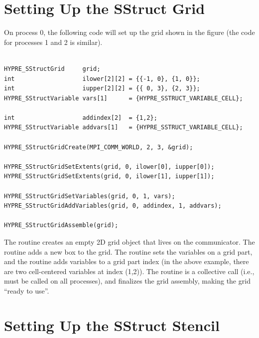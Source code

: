 
\section{Setting Up the SStruct Grid}
\label{Setting Up the SStruct Grid}

On process 0, the following code will set up the grid shown in the
figure (the code for processes 1 and 2 is similar).
\begin{display}
\begin{verbatim}

HYPRE_SStructGrid     grid;
int                   ilower[2][2] = {{-1, 0}, {1, 0}};
int                   iupper[2][2] = {{ 0, 3}, {2, 3}};
HYPRE_SStructVariable vars[1]      = {HYPRE_SSTRUCT_VARIABLE_CELL};

int                   addindex[2]  = {1,2};
HYPRE_SStructVariable addvars[1]   = {HYPRE_SSTRUCT_VARIABLE_CELL};

HYPRE_SStructGridCreate(MPI_COMM_WORLD, 2, 3, &grid);

HYPRE_SStructGridSetExtents(grid, 0, ilower[0], iupper[0]);
HYPRE_SStructGridSetExtents(grid, 0, ilower[1], iupper[1]);

HYPRE_SStructGridSetVariables(grid, 0, 1, vars);
HYPRE_SStructGridAddVariables(grid, 0, addindex, 1, addvars);

HYPRE_SStructGridAssemble(grid);

\end{verbatim}
\end{display}
The  routine creates an empty 2D grid object that lives
on the  communicator.  The 
routine adds a new box to the grid.  The  routine
sets the variables on a grid part, and the 
routine adds variables to a grid part index (in the above example,
there are two cell-centered variables at index (1,2)).  The
 routine is a collective call (i.e., must be called
on all processes), and finalizes the grid assembly, making the grid
``ready to use''.


\section{Setting Up the SStruct Stencil}
\label{Setting Up the SStruct Stencil}

